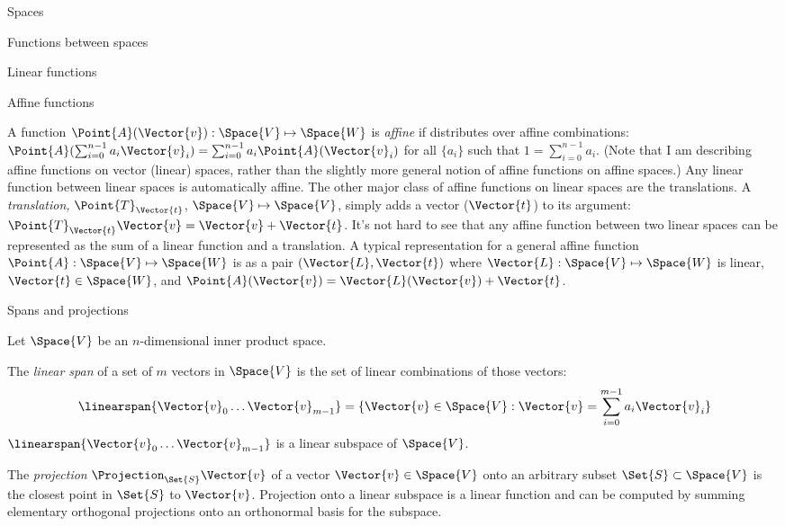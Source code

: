 \begin{plSection}{Spaces}
\begin{plSection}{Functions between spaces}
\begin{plSection}{Linear functions}
\begin{itemize}
\end {itemize}

\end{plSection}%
\begin{plSection}{Affine functions}
\label{sec:affine-functions}

A function $\Point{A}(\Vector{v}):\Space{V} \mapsto \Space{W}$
is \textit{affine} if distributes over affine combinations:
$\Point{A}(\sum_{i=0}^{n-1} a_i \Vector{v}_i) = \sum_{i=0}^{n-1} a_i \Point{A}(\Vector{v}_i) $
for all $\{a_i\}$ such that $1 = \sum_{i=0}^{n-1} a_i$.
(Note that I am describing affine functions on vector (linear) spaces,
rather than the slightly more general notion of affine functions on affine spaces.)
Any linear function between linear spaces is automatically affine.
The other major class of affine functions on linear spaces are the translations.
A \textit{translation,} $\Point{T}_{\Vector{t}}$, $\Space{V} \mapsto \Space{V}$,
simply adds a vector ($\Vector{t}$) to its argument:
$\Point{T}_{\Vector{t}} \Vector{v} = \Vector{v} + \Vector{t}$.
It's not hard to see that any affine function between two linear spaces
can be represented as the sum of a linear function and a translation.
A typical representation for a general affine function $\Point{A} : \Space{V} \mapsto \Space{W}$
is as a pair $(\Vector{L},\Vector{t})$ where $\Vector{L} : \Space{V} \mapsto \Space{W}$ is linear,
$\Vector{t} \in \Space{W}$, and $\Point{A}(\Vector{v}) = \Vector{L}(\Vector{v}) + \Vector{t}$.

\end{plSection}%
\begin{plSection}{Spans and projections}
\label{sec:spans-and-projections}

Let $\Space{V}$ be an $n$-dimensional inner product space.

The \textit{linear span} of a set of $m$ vectors in $\Space{V}$
is the set of linear combinations of those vectors:
\begin{equation}
\linearspan\{ \Vector{v}_0 \ldots \Vector{v}_{m-1} \} = \{\Vector{v} \in \Space{V} : \Vector{v} = \sum_{i=0}^{m-1} a_i \Vector{v}_i\}
\end{equation}
$\linearspan\{ \Vector{v}_0 \ldots \Vector{v}_{m-1} \}$ is a linear subspace of $\Space{V}$.

The \textit{projection} $\Projection_{\Set{S}} \Vector{v}$ of a vector $\Vector{v} \in \Space{V}$
onto an arbitrary subset $\Set{S} \subset \Space{V}$
is the closest point in $\Set{S}$ to $\Vector{v}$.
Projection onto a linear subspace is a linear function and
can be computed by summing
elementary orthogonal projections onto an orthonormal basis for the subspace.


\end{plSection}
\end{plSection}
\end{plSection}
